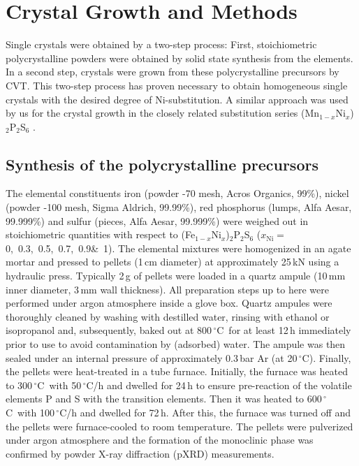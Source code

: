 \documentclass[twocolumn,superscriptaddress,prb,preprintnumbers,nobibnotes,aps]{revtex4-2}  %
\newcommand{\gc}{$^\circ$C}
\begin{document}
\section{Crystal Growth and Methods}

Single crystals were obtained by a two-step process: First, stoichiometric polycrystalline powders were obtained by solid state synthesis from the elements. In a second step, crystals were grown from these polycrystalline precursors by CVT. This two-step process has proven necessary to obtain homogeneous single crystals with the desired degree of Ni-substitution. A similar approach was used by us for the crystal growth in the closely related substitution series (Mn$_{1-x}$Ni$_{x}$)$_2$P$_2$S$_6$ \cite{Shemerliuk2021}.

\subsection{Synthesis of the polycrystalline precursors}

The elemental constituents iron (powder -70 mesh, Acros Organics, 99\%), nickel (powder -100 mesh, Sigma Aldrich, 99.99\%), red phosphorus (lumps, Alfa Aesar, 99.999\%) and sulfur (pieces, Alfa Aesar, 99.999\%) were weighed out in stoichiometric quantities with respect to (Fe$_{1-x}$Ni$_x$)$_2$P$_2$S$_6$ ($x_\textrm{Ni}=$ 0,~0.3,~0.5,~0.7,~0.9{\&}~1). The elemental mixtures were homogenized in an agate mortar and pressed to pellets (1\,cm diameter) at approximately 25\,kN using a hydraulic press. Typically 2\,g of pellets were loaded in a quartz ampule (10\,mm inner diameter, 3\,mm wall thickness). All preparation steps up to here were performed under argon atmosphere inside a glove box. Quartz ampules were thoroughly cleaned by washing with destilled water, rinsing with ethanol or isopropanol and, subsequently, baked out at 800\,\gc\ for at least 12\,h immediately prior to use to avoid contamination by (adsorbed) water. The ampule was then sealed under an internal pressure of approximately 0.3\,bar Ar (at 20\,\gc). Finally, the pellets were heat-treated in a tube furnace. Initially, the furnace was heated to 300\,\gc\ with 50\,\gc/h and dwelled for 24\,h to ensure pre-reaction of the volatile elements P and S with the transition elements. Then it was heated to 600\,\gc\ with 100\,\gc/h and dwelled for 72\,h. After this, the furnace was turned off and the pellets were furnace-cooled to room temperature. The pellets were pulverized under argon atmosphere and the formation of the monoclinic phase was confirmed by powder X-ray diffraction (pXRD) measurements.
\end{document}
